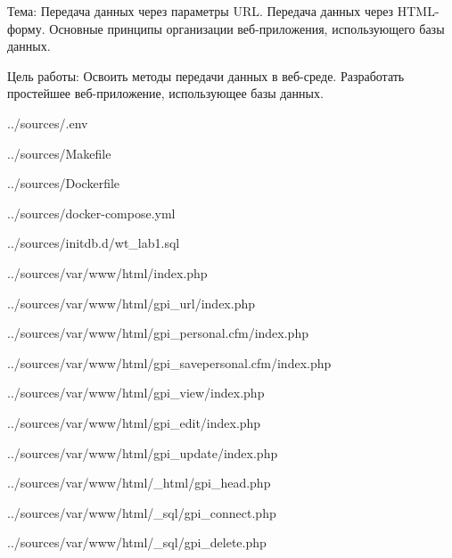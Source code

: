 Тема:
Передача данных через параметры URL.
Передача данных через HTML-форму.
Основные принципы организации веб-приложения, использующего базы данных.

Цель работы:
Освоить методы передачи данных в веб-среде.
Разработать простейшее веб-приложение, использующее базы данных.


{../sources/.env}


{../sources/Makefile}


{../sources/Dockerfile}


{../sources/docker-compose.yml}


{../sources/initdb.d/wt_lab1.sql}


{../sources/var/www/html/index.php}

\newpage


{../sources/var/www/html/gpi_url/index.php}


{../sources/var/www/html/gpi_personal.cfm/index.php}


{../sources/var/www/html/gpi_savepersonal.cfm/index.php}


{../sources/var/www/html/gpi_view/index.php}


{../sources/var/www/html/gpi_edit/index.php}


{../sources/var/www/html/gpi_update/index.php}


{../sources/var/www/html/_html/gpi_head.php}


{../sources/var/www/html/_sql/gpi_connect.php}


{../sources/var/www/html/_sql/gpi_delete.php}
